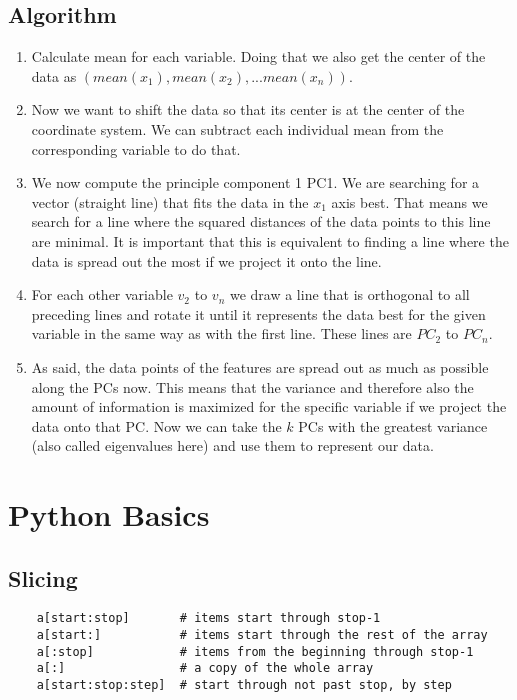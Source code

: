 \subsection{Algorithm}
\begin{enumerate}
    \item Calculate mean for each variable. Doing that we also get the center of the data as $(mean(x_{1}), mean(x_{2}), ... mean(x_{n}))$.
    \item Now we want to shift the data so that its center is at the center of the coordinate system. We can subtract each individual mean from the corresponding variable to do that.
    \item We now compute the principle component 1 PC1. We are searching for a vector (straight line) that fits the data in the $x_{1}$ axis best. That means we search for a line where the squared distances of the data points to this line are minimal. It is important that this is equivalent to finding a line where the data is spread out the most if we project it onto the line.
    \item For each other variable $v_{2}$ to $v_{n}$ we draw a line that is orthogonal to all preceding lines and rotate it until it represents the data best for the given variable in the same way as with the first line. These lines are $PC_{2}$ to $PC_{n}$.
    \item As said, the data points of the features are spread out as much as possible along the PCs now. This means that the variance and therefore also the amount of information is maximized for the specific variable if we project the data onto that PC. Now we can take the $k$ PCs with the greatest variance (also called eigenvalues here) and use them to represent our data.
\end{enumerate}

\section{Python Basics}

\subsection{Slicing}

\begin{lstlisting}
    a[start:stop]       # items start through stop-1
    a[start:]           # items start through the rest of the array
    a[:stop]            # items from the beginning through stop-1
    a[:]                # a copy of the whole array
    a[start:stop:step]  # start through not past stop, by step
\end{lstlisting}

